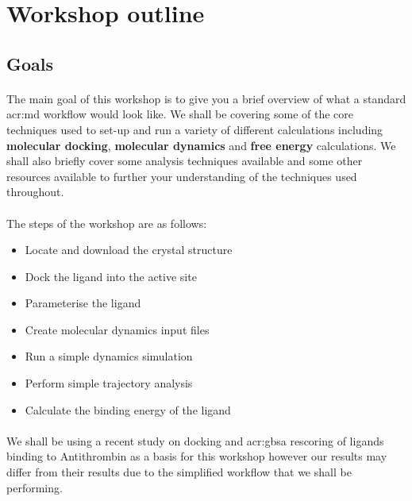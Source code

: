 \section{Workshop outline}
\label{sec:intro}

\subsection{Goals}
    \paragraph{}
    The main goal of this workshop is to give you a brief overview of what a standard \gls{acr:md} workflow would look like. We shall be covering some of the core techniques used to set-up and run a variety of different calculations including \textbf{molecular docking}, \textbf{molecular dynamics} and \textbf{free energy} calculations. We shall also briefly cover some analysis techniques available and some other resources available to further your understanding of the techniques used throughout. 

    \paragraph{}
    The steps of the workshop are as follows:
    \begin{itemize}
        \item Locate and download the crystal structure
        \item Dock the ligand into the active site
        \item Parameterise the ligand
        \item Create molecular dynamics input files
        \item Run a simple dynamics simulation
        \item Perform simple trajectory analysis
        \item Calculate the binding energy of the ligand
    \end{itemize}

    \paragraph{}
    We shall be using a recent study\cite{Zhang2017AAntithrombin} on docking and \gls{acr:gbsa} rescoring of ligands binding to Antithrombin as a basis for this workshop however our results may differ from their results due to the simplified workflow that we shall be performing.

